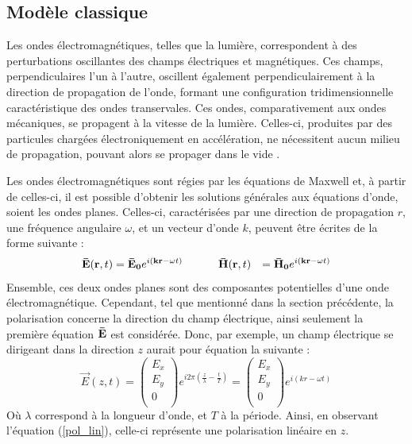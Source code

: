 \documentclass[11pt,letterpaper]{article}
\begin{document}
\subsection{Modèle classique}
Les ondes électromagnétiques, telles que la lumière, correspondent à des perturbations oscillantes des champs électriques et magnétiques. Ces champs, perpendiculaires l'un à l'autre, oscillent également perpendiculairement à la direction de propagation de l'onde, formant une configuration tridimensionnelle caractéristique des ondes transervales. Ces ondes, comparativement aux ondes mécaniques, se propagent à la vitesse de la lumière. Celles-ci, produites par des particules chargées électroniquement en accélération, ne nécessitent aucun milieu de propagation, pouvant alors se propager dans le vide \cite{byjus_unit_2020}.

Les ondes électromagnétiques sont régies par les équations de Maxwell et, à partir de celles-ci, il est possible d'obtenir les solutions générales aux équations d'onde, soient les ondes planes. Celles-ci, caractérisées par une direction de propagation $r$, une fréquence angulaire $\omega$, et un vecteur d'onde $k$, peuvent être écrites de la forme suivante \cite{zangwill_modern_2012} :
\begin{equation}
  \begin{aligned}
  \mathbf{\Bar{E}}(\textbf{r},t)&=\mathbf{\Bar{E}_{0}}e^{i(\mathbf{kr}-\omega t)} & \;\;\;\;\;\;\;\; & \mathbf{\Bar{H}}(\mathbf{r},t)&=\mathbf{\Bar{H}_{0}}e^{i(\mathbf{kr}-\omega t)} \\
  \end{aligned}
  \label{champs}
\end{equation}
Ensemble, ces deux ondes planes sont des composantes potentielles d'une onde électromagnétique. Cependant, tel que mentionné dans la section précédente, la polarisation concerne la direction du champ électrique, ainsi seulement la première équation $\mathbf{\Bar{E}}$ est considérée. Donc, par exemple, un champ électrique se dirigeant dans la direction $z$ aurait pour équation la suivante :
\begin{equation}
  \vec{E}(z,t)=
  \begin{pmatrix}
    E_{x} \\
    E_{y} \\
    0 \\
  \end{pmatrix}
  e^{i2\pi(\frac{z}{\lambda}-\frac{t}{T})}=
  \begin{pmatrix}
    E_{x} \\
    E_{y} \\
    0 \\
  \end{pmatrix}
  e^{i(kr-\omega t)}
\end{equation}
Où $\lambda$ correspond à la longueur d'onde, et $T$ à la période. Ainsi, en observant l'équation (\ref{pol_lin}), celle-ci représente une polarisation linéaire en $z$.
\end{document}
